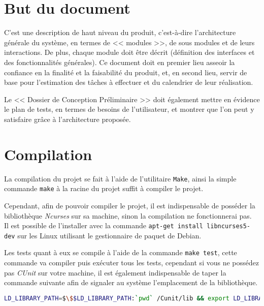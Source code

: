 \documentclass[12pt,a4paper,openany]{article}
\begin{document}
	\setcounter{tocdepth}{2}
	\setcounter{secnumdepth}{3}
	\maketitle
	\tableofcontents
	\newpage
	\section{But du document}
	C'est une description de haut niveau du produit, c'est-à-dire l'architecture générale du système, en termes de << modules >>, de sous modules et de leurs
	interactions. De plus, chaque module doit être décrit (définition des interfaces et des fonctionnalités générales). Ce document doit en premier lieu asseoir
	la confiance en la finalité et la faisabilité du produit, et, en second lieu, servir de base pour l'estimation des tâches à effectuer et du calendrier de
	leur réalisation.

	Le << Dossier de Conception Préliminaire >> doit également mettre en évidence le plan de tests, en termes de besoins de l'utilisateur, et montrer que l'on peut
	y satisfaire grâce à l'architecture proposée.
	\section{Compilation}
	La compilation du projet se fait à l'aide de l'utilitaire \texttt{Make}, ainsi la simple
	commande \texttt{make} à la racine du projet suffit à compiler le projet.

	Cependant, afin de pouvoir compiler le projet, il est indispensable de posséder la
	bibliothèque \textit{Ncurses} sur sa machine, sinon la compilation ne fonctionnerai pas.\\ 
	Il est possible de l'installer avec la commande \texttt{apt-get install libncurses5-dev}
	sur les Linux utilisant le gestionnaire de paquet de Debian.

	Les tests quant à eux se compile à l'aide de la commande \texttt{make test}, cette
	commande va compiler puis exécuter tous les tests, cependant si vous ne possédez pas
	\textit{CUnit} sur votre machine, il est également indispensable de taper la commande
	suivante afin de signaler au système l'emplacement de la bibliothèque.

	\begin{lstlisting}[language=sh,numbers=none]
LD_LIBRARY_PATH=$\$$LD_LIBRARY_PATH:`pwd` /Cunit/lib && export LD_LIBRARY_PATH		
	\end{lstlisting}
\end{document}
